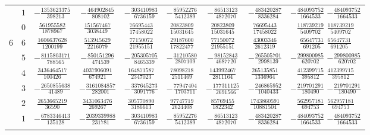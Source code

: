 \begin{table}
\begin{center}
\begin{tabular}{ccccccccc}
           &  $1$  &  $-\frac{ 1353623375}{ 398213} $  &  $-\frac{  464902845}{  808102}$  &  $-\frac{  303410983}{ 6736159}$  &  $-\frac{  85952276}{ 5412389}$  &  $-\frac{   86513123}{ 4872070}$  &  $-\frac{ 483420287}{ 8336284} $  &  $-\frac{ 484093752}{1664533}$  $-\frac{ 484093752}{1664533}$  \\ \addlinespace
           &  $0$  &  $ \frac{  561955582}{1878967} $  &  $ \frac{  151567467}{ 3038449}$  &  $ \frac{   76695443}{17458022}$  &  $ \frac{  20823809}{15031645}$  &  $ \frac{   20823809}{15031645}$  &  $ \frac{  76695443}{17458022} $  &  $ \frac{ 118739219}{5409702}$  $ \frac{ 118739219}{5409702}$  \\ \addlinespace
      $6$  &  $6$  &  $ \frac{ 1606637628}{1200199} $  &  $ \frac{  513945629}{ 2216079}$  &  $ \frac{   77150072}{21955151}$  &  $ \frac{  29187600}{17822477}$  &  $ \frac{   77150072}{21955151}$  &  $ \frac{  43003346}{ 2612319} $  &  $ \frac{  65647731}{ 691205}$  $ \frac{  65647731}{ 691205}$  \\ \addlinespace
           &  $5$  &  $-\frac{ 8115803171}{ 788565} $  &  $-\frac{  850151296}{  474539}$  &  $-\frac{  205305705}{ 8465339}$  &  $-\frac{  31210580}{ 2807109}$  &  $-\frac{   98152843}{ 4687720}$  &  $-\frac{ 265505701}{ 2998139} $  &  $-\frac{ 299800985}{ 620702}$  $-\frac{ 299800985}{ 620702}$  \\ \addlinespace
           &  $4$  &  $ \frac{ 3436464517}{ 100426} $  &  $ \frac{ 4037906091}{  674921}$  &  $ \frac{  164871587}{ 2347023}$  &  $ \frac{  78098218}{ 2511469}$  &  $ \frac{  143992467}{ 2811164}$  &  $ \frac{ 265135851}{ 1336964} $  &  $ \frac{ 412399715}{ 395812}$  $ \frac{ 412399715}{ 395812}$  \\ \addlinespace
           &  $3$  &  $-\frac{ 2650855638}{  41489} $  &  $-\frac{ 3161084857}{  282001}$  &  $-\frac{  337645273}{ 3091776}$  &  $-\frac{  77947404}{ 1703711}$  &  $-\frac{  177311125}{ 2691566}$  &  $-\frac{ 246865952}{ 1040433} $  &  $-\frac{ 219701291}{ 180490}$  $-\frac{ 219701291}{ 180490}$  \\ \addlinespace
           &  $2$  &  $ \frac{ 2653665219}{  36590} $  &  $ \frac{ 3431063476}{  269267}$  &  $ \frac{  305770890}{ 3186613}$  &  $ \frac{  97747719}{ 2624408}$  &  $ \frac{   85769455}{ 1822342}$  &  $ \frac{1743860591}{10881504} $  &  $ \frac{ 562957181}{ 694753}$  $ \frac{ 562957181}{ 694753}$  \\ \addlinespace
           &  $1$  &  $-\frac{ 6783346413}{ 135128} $  &  $-\frac{ 2039339988}{  231781}$  &  $-\frac{  303410983}{ 6736159}$  &  $-\frac{  85952276}{ 5412389}$  &  $-\frac{   86513123}{ 4872070}$  &  $-\frac{ 483420287}{ 8336284} $  &  $-\frac{ 484093752}{1664533}$  $-\frac{ 484093752}{1664533}$  \\ \addlinespace

\end{tabular}
\end{center}
\end{table}
